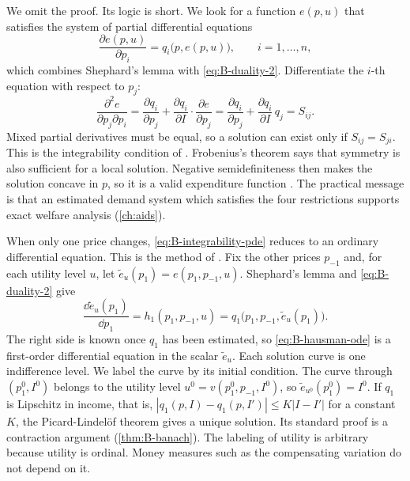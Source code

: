 We omit the proof. Its logic is short. We look for a function $e(p, u)$ that satisfies the
system of partial differential equations
\begin{equation}\label{eq:B-integrability-pde}
\frac{\partial e(p, u)}{\partial p_i} = q_i\big(p, e(p, u)\big), \qquad i = 1, \dots, n,
\end{equation}
which combines Shephard's lemma with \eqref{eq:B-duality-2}. Differentiate the $i$-th equation with respect
to $p_j$:
\begin{equation*}
\frac{\partial^2e}{\partial p_j\partial p_i} = \frac{\partial q_i}{\partial p_j} + \frac{\partial q_i}{\partial I}\cdot\frac{\partial e}{\partial p_j}
= \frac{\partial q_i}{\partial p_j} + \frac{\partial q_i}{\partial I}\,q_j = S_{ij}.
\end{equation*}
Mixed partial derivatives must be equal, so a solution can exist only if $S_{ij} = S_{ji}$. This is the
integrability condition of \citet[eqs.~5.2--5.3, p.~50]{DeatonMuellbauer1980b}. Frobenius's
theorem says that symmetry is also sufficient for a local solution. Negative semidefiniteness then makes
the solution concave in $p$, so it is a valid expenditure function
\citep[ch.~3]{MasColellWhinstonGreen1995}. The practical message is that an estimated demand system which
satisfies the four restrictions supports exact welfare analysis (\cref{ch:aids}).

When only one price changes, \eqref{eq:B-integrability-pde} reduces to an ordinary differential equation.
This is the method of \citet{Hausman1981}. Fix the other prices $p_{-1}$ and, for each utility level $u$,
let $\tilde e_u(p_1) = e(p_1, p_{-1}, u)$. Shephard's lemma and \eqref{eq:B-duality-2} give
\begin{equation}\label{eq:B-hausman-ode}
\frac{\dd\tilde e_u(p_1)}{\dd p_1} = h_1(p_1, p_{-1}, u) = q_1\big(p_1, p_{-1}, \tilde e_u(p_1)\big).
\end{equation}
The right side is known once $q_1$ has been estimated, so \eqref{eq:B-hausman-ode} is a first-order
differential equation in the scalar $\tilde e_u$. Each solution curve is one indifference level. We label
the curve by its initial condition. The curve through $(p_1^0, I^0)$ belongs to the utility level
$u^0 = v(p_1^0, p_{-1}, I^0)$, so $\tilde e_{u^0}(p_1^0) = I^0$. If $q_1$ is Lipschitz in income, that is,
$|q_1(p, I) - q_1(p, I')| \leq K|I - I'|$ for a constant $K$, the Picard-Lindel\"of theorem gives a unique solution. Its standard proof is a contraction argument
(\cref{thm:B-banach}). The labeling of utility is arbitrary because utility is ordinal. Money measures such as
the compensating variation do not depend on it.

